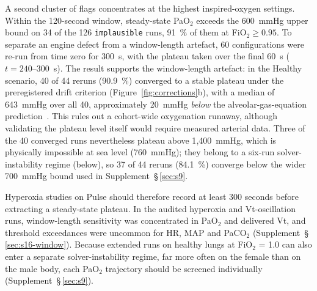 \documentclass[pdflatex,sn-nature]{sn-jnl}%
\begin{document}
A second cluster of flags concentrates at the highest inspired-oxygen settings. Within the 120-second window, steady-state PaO$_2$ exceeds the 600~mmHg upper bound on 34 of the 126 \texttt{implausible} runs, 91~\% of them at FiO$_2 \geq 0.95$. To separate an engine defect from a window-length artefact, 60 configurations were re-run from time zero for 300~s, with the plateau taken over the final 60~s ($t = 240$--$300$~s). The result supports the window-length artefact: in the Healthy scenario, 40 of 44 reruns (90.9~\%) converged to a stable plateau under the preregistered drift criterion (Figure~\ref{fig:corrections}b), with a median of 643~mmHg over all 40, approximately 20~mmHg \emph{below} the alveolar-gas-equation prediction~\cite{west2020respiratory}. This rules out a cohort-wide oxygenation runaway, although validating the plateau level itself would require measured arterial data. Three of the 40 converged runs nevertheless plateau above 1{,}400~mmHg, which is physically impossible at sea level (760~mmHg); they belong to a six-run solver-instability regime (below), so 37 of 44 reruns (84.1~\%) converge below the wider 700~mmHg bound used in Supplement~\S\,\ref{sec:s9}.

Hyperoxia studies on Pulse should therefore record at least 300 seconds before extracting a steady-state plateau. In the audited hyperoxia and Vt-oscillation runs, window-length sensitivity was concentrated in PaO$_2$ and delivered Vt, and threshold exceedances were uncommon for HR, MAP and PaCO$_2$ (Supplement~\S\,\ref{sec:s16-window}). Because extended runs on healthy lungs at FiO$_2$ = 1.0 can also enter a separate solver-instability regime, far more often on the female than on the male body, each PaO$_2$ trajectory should be screened individually (Supplement~\S\,\ref{sec:s9}).
\end{document}
